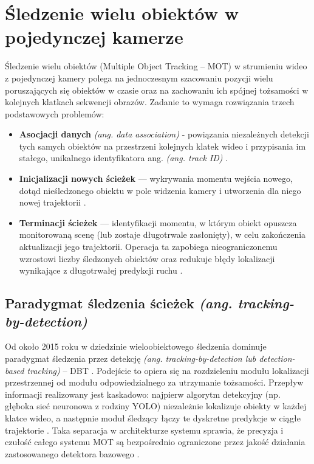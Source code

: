 \section{Śledzenie wielu obiektów w pojedynczej kamerze}

Śledzenie wielu obiektów (Multiple Object Tracking – MOT) w strumieniu wideo z pojedynczej kamery polega na jednoczesnym szacowaniu pozycji wielu poruszających się obiektów w czasie oraz na zachowaniu ich spójnej tożsamości w kolejnych klatkach sekwencji obrazów. Zadanie to wymaga rozwiązania trzech podstawowych problemów:
\begin{itemize}
  \item \textbf{Asocjacji danych} \textit{(ang. data association)} - powiązania niezależnych detekcji tych samych obiektów na przestrzeni kolejnych klatek wideo i przypisania im stałego, unikalnego identyfikatora ang. \textit{(ang. track ID)} \cite{bewley2016}.
  \item \textbf{Inicjalizacji nowych ścieżek} — wykrywania momentu wejścia nowego, dotąd nieśledzonego obiektu w pole widzenia kamery i utworzenia dla niego nowej trajektorii \cite{bewley2016}.
  \item \textbf{Terminacji ścieżek} — identyfikacji momentu, w którym obiekt opuszcza monitorowaną scenę (lub zostaje długotrwale zasłonięty), w celu zakończenia aktualizacji jego trajektorii. Operacja ta zapobiega nieograniczonemu wzrostowi liczby śledzonych obiektów oraz redukuje błędy lokalizacji wynikające z długotrwałej predykcji ruchu \cite{bewley2016}.
\end{itemize}
\subsection{Paradygmat śledzenia ścieżek \textit{(ang. tracking-by-detection)}}
Od około 2015 roku w dziedzinie wieloobiektowego śledzenia dominuje paradygmat śledzenia przez detekcję \textit{(ang. tracking-by-detection lub detection-based tracking)} – DBT \cite{wojke2017}. Podejście to opiera się na rozdzieleniu modułu lokalizacji przestrzennej od modułu odpowiedzialnego za utrzymanie tożsamości. Przepływ informacji realizowany jest kaskadowo: najpierw algorytm detekcyjny (np. głęboka sieć neuronowa z rodziny YOLO) niezależnie lokalizuje obiekty w każdej klatce wideo, a następnie moduł śledzący łączy te dyskretne predykcje w ciągłe trajektorie \cite{bewley2016, wojke2017}. Taka separacja w architekturze systemu sprawia, że precyzja i czułość całego systemu MOT są bezpośrednio ograniczone przez jakość działania zastosowanego detektora bazowego \cite{bewley2016}.

